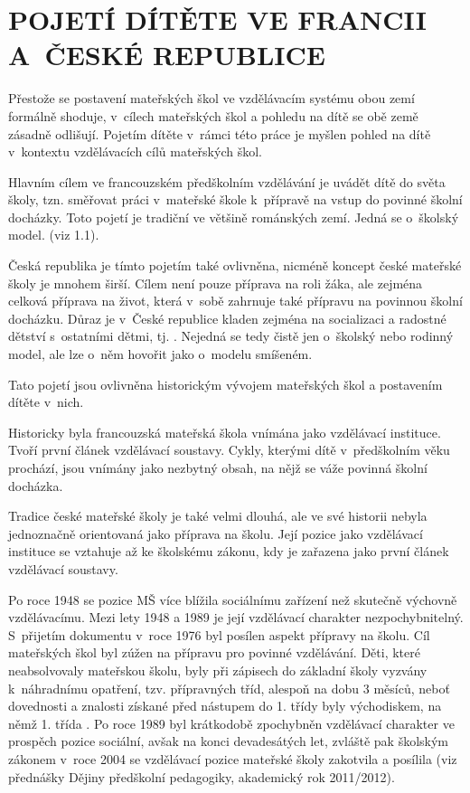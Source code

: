 \chapter{POJETÍ DÍTĚTE VE FRANCII A~ČESKÉ REPUBLICE}

Přestože se postavení mateřských škol ve vzdělávacím systému obou zemí formálně shoduje, v~cílech mateřských škol a pohledu na dítě se obě země zásadně odlišují. Pojetím dítěte v~rámci této práce je myšlen pohled na dítě v~kontextu vzdělávacích cílů mateřských škol. 

Hlavním cílem ve francouzském předškolním vzdělávání je uvádět dítě do světa školy, tzn. směřovat práci v~mateřské škole k~přípravě na vstup do povinné školní docházky. Toto pojetí je tradiční ve většině románských zemí. Jedná se o~školský model. (viz 1.1).

 Česká republika je tímto pojetím také ovlivněna, nicméně koncept české mateřské školy je mnohem širší. Cílem není pouze příprava na roli žáka, ale zejména celková příprava na život, která v~sobě zahrnuje také přípravu na povinnou školní docházku. Důraz je v~České republice kladen zejména na socializaci a radostné dětství s~ostatními dětmi, tj. . Nejedná se tedy čistě jen o~školský nebo rodinný model, ale lze o~něm hovořit jako o~modelu smíšeném.

Tato pojetí jsou ovlivněna historickým vývojem mateřských škol a postavením dítěte v~nich.

Historicky byla francouzská mateřská škola vnímána jako vzdělávací instituce. Tvoří první článek vzdělávací soustavy. Cykly, kterými dítě v~předškolním věku prochází, jsou vnímány jako nezbytný obsah, na nějž se váže povinná školní docházka. 

Tradice české mateřské školy je také velmi dlouhá, ale ve své historii nebyla jednoznačně orientovaná jako příprava na školu. Její pozice jako vzdělávací instituce se vztahuje až ke školskému zákonu, kdy je zařazena jako první článek vzdělávací soustavy. 

 Po roce 1948 se pozice MŠ více blížila sociálnímu zařízení než skutečně výchovně vzdělávacímu. Mezi lety 1948 a 1989 je její vzdělávací charakter nezpochybnitelný. S~přijetím dokumentu  v~roce 1976 byl posílen aspekt přípravy na školu. Cíl mateřských škol byl zúžen na přípravu pro povinné vzdělávání. Děti, které neabsolvovaly mateřskou školu, byly při zápisech do základní školy vyzvány k~náhradnímu opatření, tzv. přípravných tříd, alespoň na dobu 3 měsíců, neboť dovednosti a znalosti získané před nástupem do 1. třídy byly východiskem, na němž 1. třída . Po roce 1989 byl krátkodobě zpochybněn vzdělávací charakter ve prospěch pozice sociální, avšak na konci devadesátých let, zvláště pak školským zákonem v~roce 2004 se vzdělávací pozice mateřské školy zakotvila a posílila (viz přednášky Dějiny předškolní pedagogiky, akademický rok 2011/2012).

